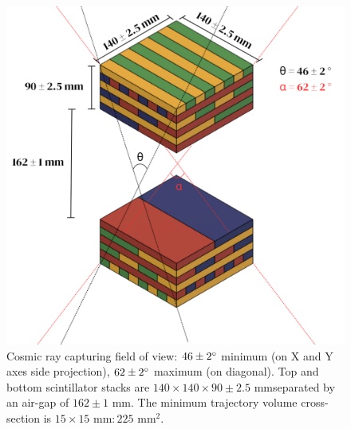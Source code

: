 \begin{figure} [h]
    \centering
    \includegraphics[scale=0.45]{figures/angle fig2.png}
    \caption{Cosmic ray capturing field of view: $46\pm2\degree$ minimum (on X and Y axes side projection), $62\pm2\degree$ maximum (on diagonal). Top and bottom scintillator stacks are $140\times140\times90 \pm2.5$ mm\textemdash separated by an air-gap of $162 \pm1$ mm. The minimum trajectory volume cross-section is $15\times15\text{ mm}: 225\text{ mm}^2$.}
    \label{angles}
\end{figure}

